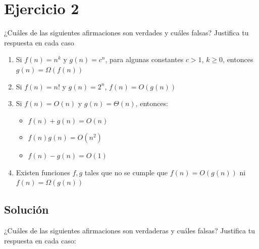 \section{Ejercicio 2}

\begin{tcolorbox}[enunciado]
¿Cuáles de las siguientes afirmaciones son verdades y cuáles falsas? Justifica tu respuesta en cada caso
\begin{enumerate}
    \item Si $f(n)=n^{k}$ y $g(n)=c^{n}$, para algunas constantes $c>1$, $k\ge0$, entonces $g(n) = \Omega(f(n))$
    \item Si $f(n) = n!$ y $g(n) = 2^n$, $f(n)=O(g(n))$
    \item Si $f(n) = O(n)$ y $g(n) = \Theta(n)$, entonces:
    \begin{itemize}
        \item $f(n)+g(n)=O(n)$
        \item $f(n)g(n)=O(n^{2})$
        \item $f(n)-g(n)=O(1)$
    \end{itemize}
    \item Existen funciones $f, g$ tales que no se cumple que $f(n)=O(g(n))$ ni $f(n)=\Omega(g(n))$
\end{enumerate}
\end{tcolorbox}

\subsection{Solución} 

¿Cuáles de las siguientes afirmaciones son verdaderas y cuáles falsas? Justifica tu respuesta en cada caso:

